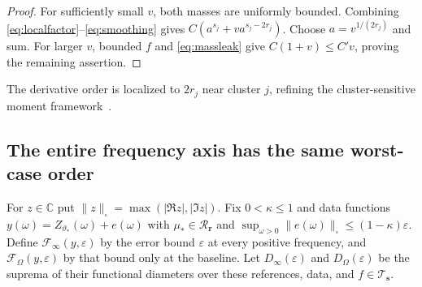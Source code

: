 \documentclass[10pt]{amsart}
\theoremstyle{definition}
\theoremstyle{remark}
\theoremstyle{plain}
\newcommand{\C}{\mathbb C}
\newcommand{\eps}{\varepsilon}
\newcommand{\F}{\mathcal F}
\newcommand{\Tclass}{\mathcal T_{\boldsymbol s}}
\newcommand{\Rclass}{\mathcal R_{\boldsymbol r}}
\begin{document}
\begin{proof}
For sufficiently small $v$, both masses are uniformly bounded. Combining \eqref{eq:localfactor}--\eqref{eq:smoothing} gives $C(a^{s_j}+va^{s_j-2r_j})$. Choose $a=v^{1/(2r_j)}$ and sum. For larger $v$, bounded $f$ and \eqref{eq:massleak} give $C(1+v)\le C'v$, proving the remaining assertion.
\end{proof}

The derivative order is localized to $2r_j$ near cluster $j$, refining the cluster-sensitive moment framework~\cite{wuyang,nguyen}.

\subsection{The entire frequency axis has the same worst-case order}
For $z\in\C$ put $\|z\|_\square=\max(|\Re z|,|\Im z|)$. Fix $0<\kappa\le1$ and data functions $y(\omega)=Z_{\vartheta_*}(\omega)+e(\omega)$ with $\mu_*\in\Rclass$ and $\sup_{\omega>0}\|e(\omega)\|_\square\le(1-\kappa)\eps$. Define $\F_\infty(y,\eps)$ by the error bound $\eps$ at every positive frequency, and $\F_\Omega(y,\eps)$ by that bound only at the baseline. Let $D_\infty(\eps)$ and $D_\Omega(\eps)$ be the suprema of their functional diameters over these references, data, and $f\in\Tclass$.
\end{document}
